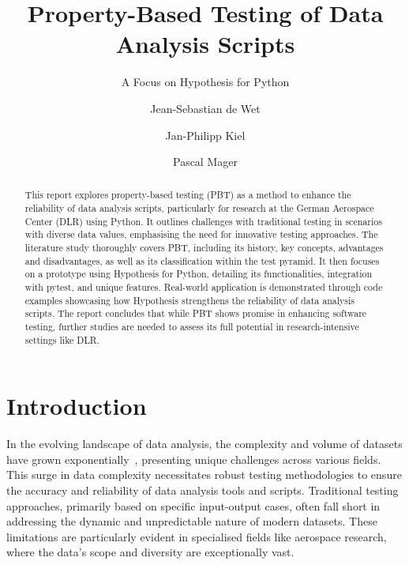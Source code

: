 \documentclass[runningheads]{llncs}
\begin{document}
%
\title{Property-Based Testing of Data Analysis Scripts}
\subtitle{A Focus on Hypothesis for Python}
%
%
\author{Jean-Sebastian de Wet \and
  Jan-Philipp Kiel \and
  Pascal Mager}
%
%
%
\maketitle              %
%
\begin{abstract}
  This report explores property-based testing (PBT) as a meth\-od to enhance the reliability of data analysis scripts, particularly for research at the German Aerospace Center (DLR) using Python. It outlines challenges with traditional testing in scenarios with diverse data values, emphasising the need for innovative testing approaches. The literature study thoroughly covers PBT, including its history, key concepts, advantages and disadvantages, as well as its classification within the test pyramid. It then focuses on a prototype using Hypothesis for Python, detailing its functionalities, integration with pytest, and unique features. Real-world application is demonstrated through code examples showcasing how Hypothesis strengthens the reliability of data analysis scripts. The report concludes that while PBT shows promise in enhancing software testing, further studies are needed to assess its full potential in research-intensive settings like DLR.

\end{abstract}
%
%
%
\section{Introduction}
In the evolving landscape of data analysis, the complexity and volume of datasets have grown exponentially~\cite{Taylor2023}, presenting unique challenges across various fields. This surge in data complexity necessitates robust testing methodologies to ensure the accuracy and reliability of data analysis tools and scripts. Traditional testing approaches, primarily based on specific input-output cases, often fall short in addressing the dynamic and unpredictable nature of modern datasets. These limitations are particularly evident in specialised fields like aerospace research, where the data's scope and diversity are exceptionally vast.
\end{document}
